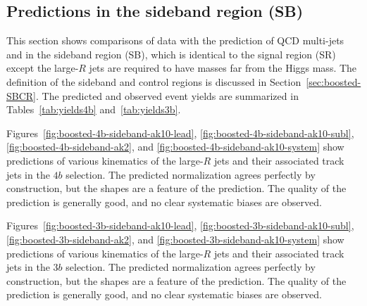 \subsection{Predictions in the sideband region (SB)}
\label{sec:boosted-sb}

This section shows comparisons of data with the prediction of QCD multi-jets and \ttbar in the sideband region (SB), which is identical to the signal region (SR) except the large-$R$ jets are required to have masses far from the Higgs mass. The definition of the sideband and control regions is discussed in Section~\ref{sec:boosted-SBCR}. The predicted and observed event yields are summarized in Tables~\ref{tab:yields4b} and~\ref{tab:yields3b}.

Figures~\ref{fig:boosted-4b-sideband-ak10-lead}, \ref{fig:boosted-4b-sideband-ak10-subl}, \ref{fig:boosted-4b-sideband-ak2},  and \ref{fig:boosted-4b-sideband-ak10-system} show predictions of various kinematics of the large-$R$ jets and their associated track jets in the $4b$ selection. The predicted normalization agrees perfectly by construction, but the shapes are a feature of the prediction. The quality of the prediction is generally good, and no clear systematic biases are observed.


Figures~\ref{fig:boosted-3b-sideband-ak10-lead}, \ref{fig:boosted-3b-sideband-ak10-subl}, \ref{fig:boosted-3b-sideband-ak2},  and \ref{fig:boosted-3b-sideband-ak10-system} show predictions of various kinematics of the large-$R$ jets and their associated track jets in the $3b$ selection. The predicted normalization agrees perfectly by construction, but the shapes are a feature of the prediction. The quality of the prediction is generally good, and no clear systematic biases are observed.


